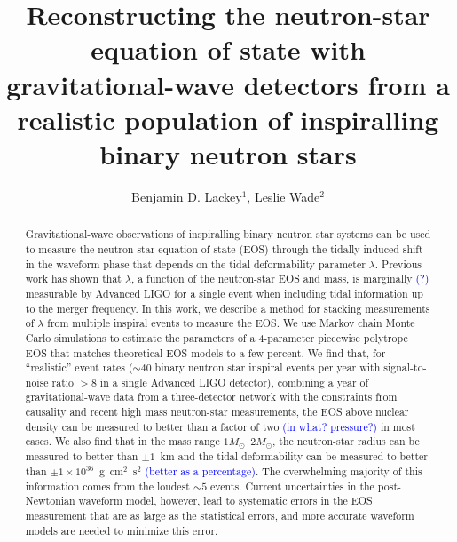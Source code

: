 \documentclass[twocolumn,prd,amssymb,aps,nofootinbib,showpacs,epsf]{revtex4}
\newcommand\les[2]{\textcolor{blue}{{#1}\sout{#2}}}
\begin{document}
\title{Reconstructing the neutron-star equation of state with gravitational-wave detectors from a realistic population of inspiralling binary neutron stars}

\author{Benjamin D. Lackey$^1$, Leslie Wade$^2$}


\begin{abstract}
Gravitational-wave observations of inspiralling binary neutron star systems can be used to measure the neutron-star equation of state (EOS) through the tidally induced shift in the waveform phase that depends on the tidal deformability parameter $\lambda$. Previous work has shown that $\lambda$, a function of the neutron-star EOS and mass, is marginally \les{(?)}{} measurable by Advanced LIGO for a single event when including tidal information up to the merger frequency. In this work, we describe a method for stacking measurements of $\lambda$ from multiple inspiral events to measure the EOS. We use Markov chain Monte Carlo simulations to estimate the parameters of a 4-parameter piecewise polytrope EOS that matches theoretical EOS models to a few percent. We find that, for ``realistic'' event rates ($\sim 40$ binary neutron star inspiral events per year with signal-to-noise ratio $> 8$ in a single Advanced LIGO detector), combining a year of gravitational-wave data from a three-detector network with the constraints from causality and recent high mass neutron-star measurements, the EOS above nuclear density can be measured to better than a factor of two \les{(in what? pressure?)}{} in most cases. We also find that in the mass range $1M_\odot$--$2M_\odot$, the neutron-star radius can be measured to better than $\pm 1$~km and the tidal deformability can be measured to better than $\pm 1 \times 10^{36}$~g~cm$^2$~s$^2$ \les{(better as a percentage)}{}. The overwhelming majority of this information comes from the loudest $\sim 5$ events. Current uncertainties in the post-Newtonian waveform model, however, lead to systematic errors in the EOS measurement that are as large as the statistical errors, and more accurate waveform models are needed to minimize this error.
\end{abstract}

\end{document}
